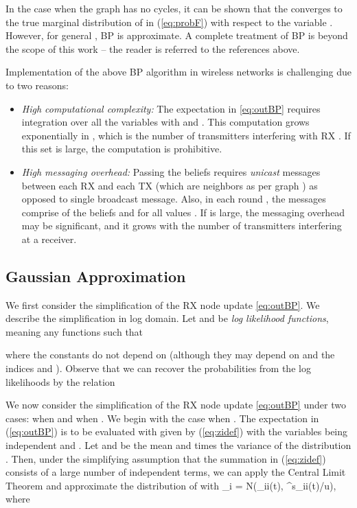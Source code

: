 \documentclass[letterpaper,twocolumn,twoside]{IEEEtran}
\def\beq{}
\newcommand{\sbfhat}{\widehat{\mathbf{s}}}
\newcommand{\zbf}{\mathbf{z}}
\newcommand{\Qbf}{\mathbf{Q}}
\begin{document}
In the case when the graph  has no cycles, it can be shown that
the  converges to the true marginal distribution of
 in (\ref{eq:probF}) with respect to the variable .
However, for general , BP is approximate.  A complete treatment
of BP is beyond the scope of this work -- the reader is referred to
the references above.


Implementation of the above BP algorithm in wireless networks is
challenging due to two reasons:
\begin{itemize}
\item \emph{High computational complexity:} The
expectation in \eqref{eq:outBP} requires integration over all the
variables  with  and . This
computation grows exponentially in , which is the number
of transmitters interfering with RX .  If this set is large, the
computation is prohibitive.
\item \emph{High messaging overhead:} Passing the beliefs requires
\emph{unicast} messages between each RX and each TX (which are
neighbors as per graph ) as opposed to single broadcast message.
Also, in each round , the messages comprise of the beliefs  and  for all values . If  is large, the messaging overhead may be
significant, and it grows with the number of transmitters
interfering at a receiver.
\end{itemize}
\subsection{Gaussian Approximation} \label{sec:gaussBP}

We first consider the simplification of the RX node update
\eqref{eq:outBP}. We describe the simplification in log domain. Let
 and  be
\emph{log likelihood functions}, meaning any functions such that

where the constants do not depend on  (although they may
depend on  and the indices  and ). Observe that we can
recover the probabilities from the log likelihoods by the relation


We now consider the simplification of the RX node update
\eqref{eq:outBP} under two cases:  when  and when .
We begin with the case when . The expectation in
(\ref{eq:outBP}) is to be evaluated with  given by
(\ref{eq:zidef}) with the variables  being independent and
. Let  and
 be the mean and  times the variance of
the distribution . Then, under the simplifying
assumption that the summation in (\ref{eq:zidef}) consists of a
large number of independent terms, we can apply the Central Limit
Theorem and approximate the distribution of  with \beq
\label{eq:ziGauss}
    \zbf_i = {\cal N}(\sbfhat_{ii}(t), \Qbf^s_{ii}(t)/u),
\eeq where
\end{document}
